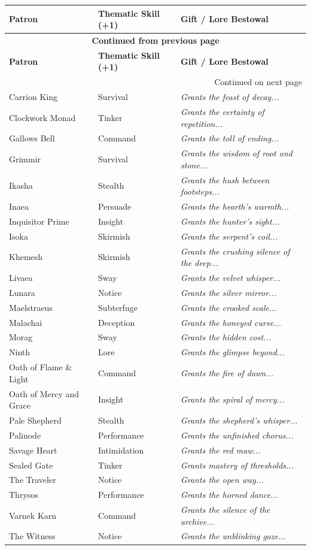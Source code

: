 \begin{longtable}{@{}p{4.2cm}p{3.2cm}p{7.2cm}@{}}
\toprule
\textbf{Patron} & \textbf{Thematic Skill (+1)} & \textbf{Gift / Lore Bestowal} \\
\midrule
\endfirsthead
\multicolumn{3}{c}{{\bfseries Continued from previous page}} \\
\toprule
\textbf{Patron} & \textbf{Thematic Skill (+1)} & \textbf{Gift / Lore Bestowal} \\
\midrule
\endhead
\midrule
\multicolumn{3}{r}{{Continued on next page}} \\
\endfoot
\bottomrule
\endlastfoot

Carrion King & Survival & \emph{Grants the feast of decay...} \\
Clockwork Monad & Tinker & \emph{Grants the certainty of repetition...} \\
Gallows Bell & Command & \emph{Grants the toll of ending...} \\
Grimmir & Survival & \emph{Grants the wisdom of root and stone...} \\
Ikasha & Stealth & \emph{Grants the hush between footsteps...} \\
Inaea & Persuade & \emph{Grants the hearth's warmth...} \\
Inquisitor Prime & Insight & \emph{Grants the hunter's sight...} \\
Isoka & Skirmish & \emph{Grants the serpent's coil...} \\
Khemesh & Skirmish & \emph{Grants the crushing silence of the deep...} \\
Livaea & Sway & \emph{Grants the velvet whisper...} \\
Lunara & Notice & \emph{Grants the silver mirror...} \\
Maelstraeus & Subterfuge & \emph{Grants the crooked scale...} \\
Malachai & Deception & \emph{Grants the honeyed curse...} \\
Morag & Sway & \emph{Grants the hidden cost...} \\
Ninth & Lore & \emph{Grants the glimpse beyond...} \\
Oath of Flame \& Light & Command & \emph{Grants the fire of dawn...} \\
Oath of Mercy and Grace & Insight & \emph{Grants the spiral of mercy...} \\
Pale Shepherd & Stealth & \emph{Grants the shepherd's whisper...} \\
Palinode & Performance & \emph{Grants the unfinished chorus...} \\
Savage Heart & Intimidation & \emph{Grants the red maw...} \\
Sealed Gate & Tinker & \emph{Grants mastery of thresholds...} \\
The Traveler & Notice & \emph{Grants the open way...} \\
Thrysos & Performance & \emph{Grants the horned dance...} \\
Varnek Karn & Command & \emph{Grants the silence of the archive...} \\
The Witness & Notice & \emph{Grants the unblinking gaze...} \\
\end{longtable}

